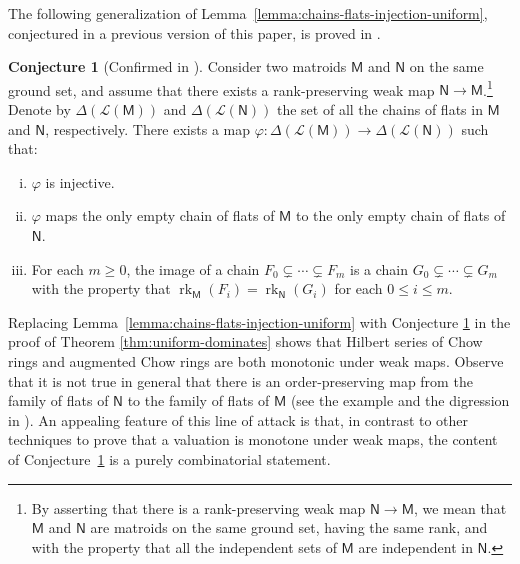 \documentclass[11pt, a4paper, english]{amsart}
\theoremstyle{teoremas}
\theoremstyle{definition}
\newtheorem{conjecture}[theorem]{Conjecture}
\DeclareMathOperator{\rk}{rk}
\newcommand{\M}{\mathsf{M}}
\newcommand{\N}{\mathsf{N}}
\begin{document}
The following generalization of Lemma~\ref{lemma:chains-flats-injection-uniform}, conjectured in a previous version of this paper, is proved in \cite{elias-miyata-proudfoot-vecchi}.
\begin{conjecture}[Confirmed in \cite{elias-miyata-proudfoot-vecchi}]\label{conj:weak-maps-monotonicity}
    Consider two matroids $\M$ and $\N$ on the same ground set, and assume that there exists a rank-preserving weak map $\N\to \M$.\footnote{By asserting that there is a rank-preserving weak map $\N\to \M$, we mean that $\M$ and $\N$ are matroids on the same ground set, having the same rank, and with the property that all the independent sets of $\M$ are independent in $\N$.} Denote by $\Delta(\mathcal{L}(\M))$ and $\Delta(\mathcal{L}(\N))$ the set of all the chains of flats in $\M$ and $\N$, respectively. There exists a map $\varphi\colon\Delta(\mathcal{L}(\M))\to \Delta(\mathcal{L}(\N))$ such that:
    \begin{enumerate}[(i)]
        \item $\varphi$ is injective.
        \item $\varphi$ maps the only empty chain of flats of $\M$ to the only empty chain of flats of $\N$.
        \item For each $m\geq 0$, the image of a chain $F_0\subsetneq\cdots\subsetneq F_m$ is a chain $G_0\subsetneq\cdots\subsetneq G_m$ with the property that $\rk_{\M}(F_i)=\rk_{\N}(G_i)$ for each $0\leq i\leq m$. 
    \end{enumerate}
\end{conjecture}
Replacing Lemma~\ref{lemma:chains-flats-injection-uniform} with Conjecture \ref{conj:weak-maps-monotonicity} in the proof of Theorem \ref{thm:uniform-dominates} shows that Hilbert series of Chow rings and augmented Chow rings are both monotonic under weak maps. Observe that it is not true in general that there is an order-preserving map from the family of flats of $\N$ to the family of flats of $\M$ (see the example and the digression in \cite[p. 259]{lucas}).
An appealing feature of this line of attack is that, in contrast to other techniques to prove that a valuation is monotone under weak maps, the content of Conjecture~\ref{conj:weak-maps-monotonicity} is a purely combinatorial statement.
\end{document}
